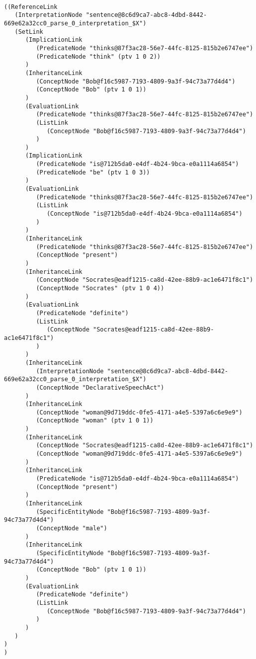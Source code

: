 \begin{verbatim}

((ReferenceLink
   (InterpretationNode "sentence@8c6d9ca7-abc8-4dbd-8442-669e62a32cc0_parse_0_interpretation_$X")
   (SetLink
      (ImplicationLink
         (PredicateNode "thinks@87f3ac28-56e7-44fc-8125-815b2e6747ee")
         (PredicateNode "think" (ptv 1 0 2))
      )
      (InheritanceLink
         (ConceptNode "Bob@f16c5987-7193-4809-9a3f-94c73a77d4d4")
         (ConceptNode "Bob" (ptv 1 0 1))
      )
      (EvaluationLink
         (PredicateNode "thinks@87f3ac28-56e7-44fc-8125-815b2e6747ee")
         (ListLink
            (ConceptNode "Bob@f16c5987-7193-4809-9a3f-94c73a77d4d4")
         )
      )
      (ImplicationLink
         (PredicateNode "is@712b5da0-e4df-4b24-9bca-e0a1114a6854")
         (PredicateNode "be" (ptv 1 0 3))
      )
      (EvaluationLink
         (PredicateNode "thinks@87f3ac28-56e7-44fc-8125-815b2e6747ee")
         (ListLink
            (ConceptNode "is@712b5da0-e4df-4b24-9bca-e0a1114a6854")
         )
      )
      (InheritanceLink
         (PredicateNode "thinks@87f3ac28-56e7-44fc-8125-815b2e6747ee")
         (ConceptNode "present")
      )
      (InheritanceLink
         (ConceptNode "Socrates@eadf1215-ca8d-42ee-88b9-ac1e6471f8c1")
         (ConceptNode "Socrates" (ptv 1 0 4))
      )
      (EvaluationLink
         (PredicateNode "definite")
         (ListLink
            (ConceptNode "Socrates@eadf1215-ca8d-42ee-88b9-ac1e6471f8c1")
         )
      )
      (InheritanceLink
         (InterpretationNode "sentence@8c6d9ca7-abc8-4dbd-8442-669e62a32cc0_parse_0_interpretation_$X")
         (ConceptNode "DeclarativeSpeechAct")
      )
      (InheritanceLink
         (ConceptNode "woman@9d719ddc-0fe5-4171-a4e5-5397a6c6e9e9")
         (ConceptNode "woman" (ptv 1 0 1))
      )
      (InheritanceLink
         (ConceptNode "Socrates@eadf1215-ca8d-42ee-88b9-ac1e6471f8c1")
         (ConceptNode "woman@9d719ddc-0fe5-4171-a4e5-5397a6c6e9e9")
      )
      (InheritanceLink
         (PredicateNode "is@712b5da0-e4df-4b24-9bca-e0a1114a6854")
         (ConceptNode "present")
      )
      (InheritanceLink
         (SpecificEntityNode "Bob@f16c5987-7193-4809-9a3f-94c73a77d4d4")
         (ConceptNode "male")
      )
      (InheritanceLink
         (SpecificEntityNode "Bob@f16c5987-7193-4809-9a3f-94c73a77d4d4")
         (ConceptNode "Bob" (ptv 1 0 1))
      )
      (EvaluationLink
         (PredicateNode "definite")
         (ListLink
            (ConceptNode "Bob@f16c5987-7193-4809-9a3f-94c73a77d4d4")
         )
      )
   )
)
)

\end{verbatim}


